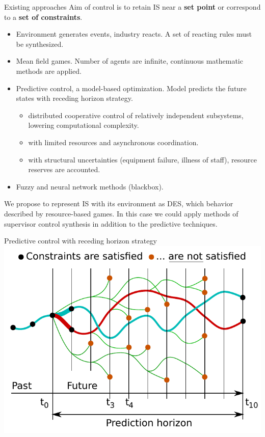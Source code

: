 \documentclass[10pt,dvipsnames]{beamer}
\begin{document}
\begin{frame}{Existing approaches}
  Aim of control is to retain IS near a \textbf{set point} or correspond to a \textbf{set of constraints}.
  \begin{itemize}
  \item Environment generates events, industry reacts. A set of reacting rules must be synthesized.
  \item Mean field games. Number of agents are infinite, continuous mathematic methods are applied.
  \item Predictive control, a model-based optimization. Model predicts the future states with \alert{receding horizon} strategy.
    \begin{itemize}
     \item \alert{distributed cooperative control} of relatively
       independent subsystems, lowering computational complexity.
     \item with limited resources and asynchronous coordination.
     \item with structural uncertainties (equipment failure, illness of staff), resource reserves are accounted.
     \end{itemize}
  \item Fuzzy and neural network methods (blackbox).
  \end{itemize}

  We propose to represent IS with its environment as DES, which behavior described by resource-based games.  In this case we could apply methods of supervisor control synthesis in addition to the predictive techniques.
\end{frame}

\begin{frame}{Predictive control with receding horizon strategy}
  \centering
  \includegraphics[width=\linewidth]{predictive-horizon.pdf}
\end{frame}
\end{document}
